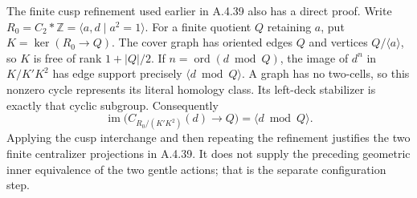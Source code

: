 The finite cusp refinement used earlier in A.4.39 also has a
direct proof.  Write $R_0=C_2*\mathbb Z=\langle a,d\mid a^2=1\rangle$.
For a finite quotient $Q$ retaining $a$, put $K=\ker(R_0\to Q)$.
The cover graph has oriented edges $Q$ and vertices
$Q/\langle a\rangle$, so $K$ is free of rank $1+|Q|/2$.
If $n=\operatorname{ord}(d\bmod Q)$, the image of $d^n$
in $K/K'K^2$ has edge support precisely $\langle d\bmod Q\rangle$.
A graph has no two-cells, so this nonzero cycle represents its
literal homology class.  Its left-deck stabilizer is exactly
that cyclic subgroup.  Consequently
\[
 \operatorname{im}\bigl(C_{R_0/(K'K^2)}(d)\to Q\bigr)
                       =\langle d\bmod Q\rangle.
\]
Applying the cusp interchange and then repeating the refinement
justifies the two finite centralizer projections in A.4.39.
It does not supply the preceding geometric inner equivalence of
the two gentle actions; that is the separate configuration step.


